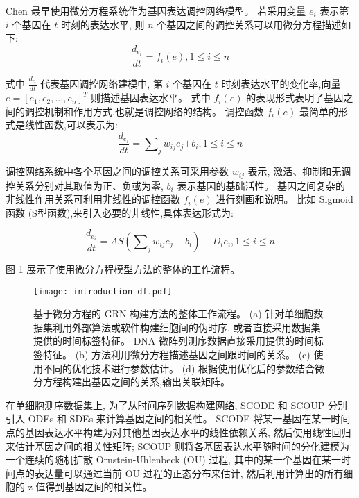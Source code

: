 Chen  最早使用微分方程系统作为基因表达调控网络模型。
若采用变量 $e_i$ 表示第 $i$ 个基因在 $t$ 时刻的表达水平, 则 $n$ 个基因之间的调控关系可以用微分方程描述如下:
\begin{equation}
\frac{{d_{e_i}}}{{dt}} = f_i (e),1 \le i \le n
\end{equation}

式中 $\frac{{d_{e_i }}}{{dt}}$ 代表基因调控网络建模中,
第 $i$ 个基因在 $t$ 时刻表达水平的变化率,向量 $e=[e_1,e_2,...,e_n]^T$ 则描述基因表达水平。
式中 $f_i(e)$ 的表现形式表明了基因之间的调控机制和作用方式,也就是调控网络的结构。
调控函数 $f_i(e)$ 最简单的形式是线性函数,可以表示为:
\begin{equation}
\frac{{d_{e_i }}}{{dt}} = \sum\nolimits_j {w_{ij} e_j} { + b_i } ,1 \le i \le n
\end{equation}

调控网络系统中各个基因之间的调控关系可采用参数 $w_{ij}$ 表示,
激活、抑制和无调控关系分别对其取值为正、负或为零, $b_i$ 表示基因的基础活性。
基因之间复杂的非线性作用关系可利用非线性的调控函数 $f_i(e)$ 进行刻画和说明。
比如 Sigmoid 函数 (S型函数),来引入必要的非线性,具体表达形式为:

\begin{equation}
\frac{{d_{e_i } }}{{dt}} = AS(\sum\nolimits_j {w_{ij} e_j } + b_i) - D_i e_i ,1 \le i \le n
\end{equation}

图 \ref{fig:pre-df} 展示了使用微分方程模型方法的整体的工作流程。
\begin{figure}[!htbp]
    \centering
    \texttt{[image: introduction-df.pdf]}
    \caption{
        基于微分方程的 GRN 构建方法的整体工作流程。
        (a) 针对单细胞数据集利用外部算法或软件构建细胞间的伪时序, 或者直接采用数据集提供的时间标签特征。
         DNA 微阵列测序数据直接采用提供的时间标签特征。
        (b) 方法利用微分方程描述基因之间跟时间的关系。
        (c) 使用不同的优化技术进行参数估计。
        (d) 根据使用优化后的参数结合微分方程构建出基因之间的关系,输出关联矩阵。
    }
    \label{fig:pre-df}
\end{figure}

在单细胞测序数据集上, 
为了从时间序列数据构建网络, SCODE  和 SCOUP  
分别引入 ODEs 和 SDEs 来计算基因之间的相关性。
SCODE 将某一基因在某一时间点的基因表达水平构建为对其他基因表达水平的线性依赖关系,
然后使用线性回归来估计基因之间的相关性矩阵;
SCOUP 则将各基因表达水平随时间的分化建模为一个连续的随机扩散 Ornstein-Uhlenbeck (OU) 过程,
其中的某一个基因在某一时间点的表达量可以通过当前 OU 过程的正态分布来估计,
然后利用计算出的所有细胞的 z 值得到基因之间的相关性。

